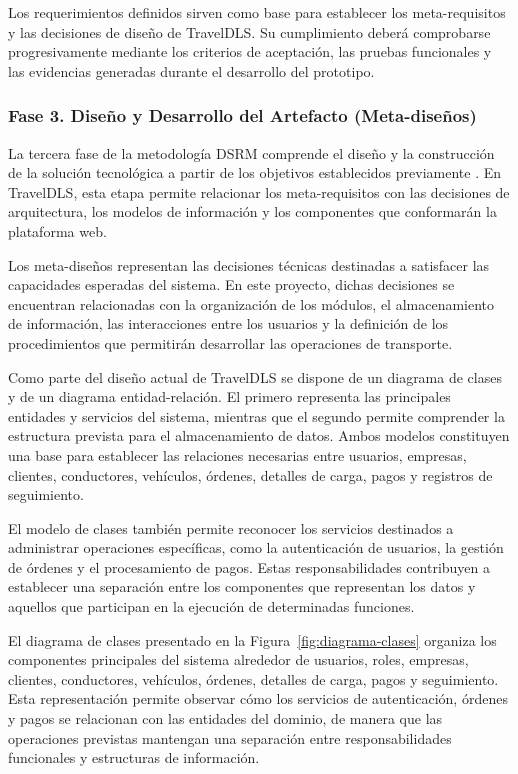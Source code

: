 Los requerimientos definidos sirven como base para establecer los meta-requisitos y las decisiones de diseño de TravelDLS. Su cumplimiento deberá comprobarse progresivamente mediante los criterios de aceptación, las pruebas funcionales y las evidencias generadas durante el desarrollo del prototipo.

\subsubsection{Fase 3. Diseño y Desarrollo del Artefacto (Meta-diseños)}
\label{sec:metodo-fase3}

La tercera fase de la metodología DSRM comprende el diseño y la construcción de la solución tecnológica a partir de los objetivos establecidos previamente \parencite{peffers2007dsrm}. En TravelDLS, esta etapa permite relacionar los meta-requisitos con las decisiones de arquitectura, los modelos de información y los componentes que conformarán la plataforma web.

Los meta-diseños representan las decisiones técnicas destinadas a satisfacer las capacidades esperadas del sistema. En este proyecto, dichas decisiones se encuentran relacionadas con la organización de los módulos, el almacenamiento de información, las interacciones entre los usuarios y la definición de los procedimientos que permitirán desarrollar las operaciones de transporte.

Como parte del diseño actual de TravelDLS se dispone de un diagrama de clases y de un diagrama entidad-relación. El primero representa las principales entidades y servicios del sistema, mientras que el segundo permite comprender la estructura prevista para el almacenamiento de datos. Ambos modelos constituyen una base para establecer las relaciones necesarias entre usuarios, empresas, clientes, conductores, vehículos, órdenes, detalles de carga, pagos y registros de seguimiento.

El modelo de clases también permite reconocer los servicios destinados a administrar operaciones específicas, como la autenticación de usuarios, la gestión de órdenes y el procesamiento de pagos. Estas responsabilidades contribuyen a establecer una separación entre los componentes que representan los datos y aquellos que participan en la ejecución de determinadas funciones.

El diagrama de clases presentado en la Figura~\ref{fig:diagrama-clases} organiza los componentes principales del sistema alrededor de usuarios, roles, empresas, clientes, conductores, vehículos, órdenes, detalles de carga, pagos y seguimiento. Esta representación permite observar cómo los servicios de autenticación, órdenes y pagos se relacionan con las entidades del dominio, de manera que las operaciones previstas mantengan una separación entre responsabilidades funcionales y estructuras de información.

